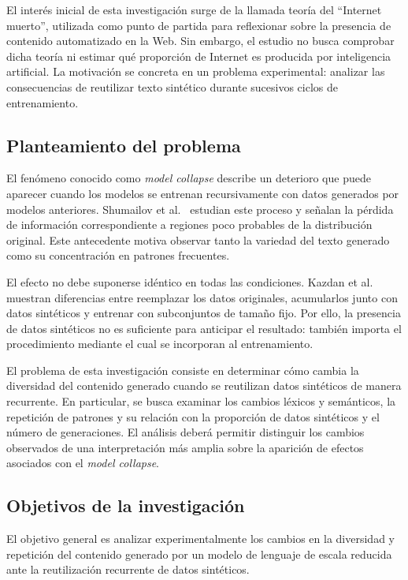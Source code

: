\documentclass[12pt,letterpaper]{article}
\begin{document}
El interés inicial de esta investigación surge de la llamada teoría del
``Internet muerto'', utilizada como punto de partida para reflexionar sobre
la presencia de contenido automatizado en la Web. Sin embargo, el estudio
no busca comprobar dicha teoría ni estimar qué proporción de Internet es
producida por inteligencia artificial. La motivación se concreta en un
problema experimental: analizar las consecuencias de reutilizar texto
sintético durante sucesivos ciclos de entrenamiento.

\subsection{Planteamiento del problema}

El fenómeno conocido como \textit{model collapse} describe un deterioro que
puede aparecer cuando los modelos se entrenan recursivamente con datos
generados por modelos anteriores. Shumailov et al.\ \cite{shumailov2024}
estudian este proceso y señalan la pérdida de información correspondiente
a regiones poco probables de la distribución original. Este antecedente
motiva observar tanto la variedad del texto generado como su concentración
en patrones frecuentes.

El efecto no debe suponerse idéntico en todas las condiciones. Kazdan
et al.\ \cite{kazdan2025} muestran diferencias entre reemplazar los datos
originales, acumularlos junto con datos sintéticos y entrenar con
subconjuntos de tamaño fijo. Por ello, la presencia de datos sintéticos no
es suficiente para anticipar el resultado: también importa el procedimiento
mediante el cual se incorporan al entrenamiento.

El problema de esta investigación consiste en determinar cómo cambia la
diversidad del contenido generado cuando se reutilizan datos sintéticos de
manera recurrente. En particular, se busca examinar los cambios léxicos y
semánticos, la repetición de patrones y su relación con la proporción de
datos sintéticos y el número de generaciones. El análisis deberá permitir
distinguir los cambios observados de una interpretación más amplia sobre
la aparición de efectos asociados con el \textit{model collapse}.

\subsection{Objetivos de la investigación}

El objetivo general es analizar experimentalmente los cambios en la
diversidad y repetición del contenido generado por un modelo de lenguaje
de escala reducida ante la reutilización recurrente de datos sintéticos.
\end{document}
